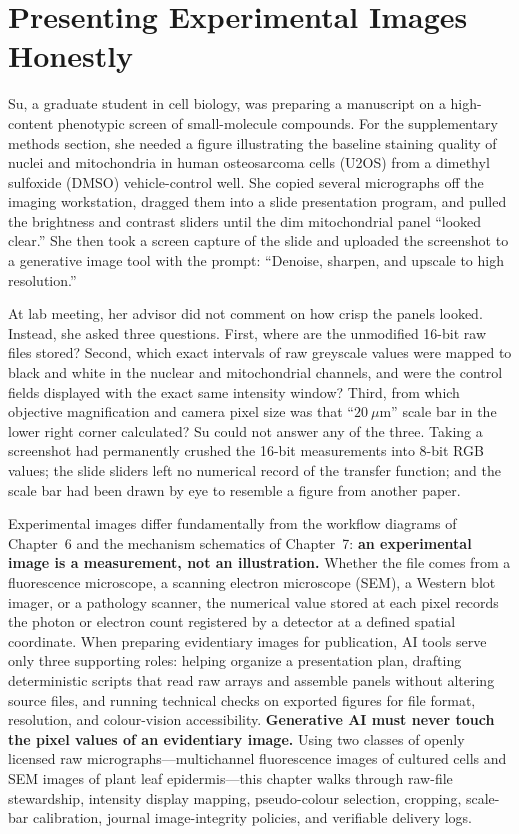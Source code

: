 \chapter{Presenting Experimental Images Honestly}

Su, a graduate student in cell biology, was preparing a manuscript on a high-content phenotypic screen of small-molecule compounds. For the supplementary methods section, she needed a figure illustrating the baseline staining quality of nuclei and mitochondria in human osteosarcoma cells (U2OS) from a dimethyl sulfoxide (DMSO) vehicle-control well. She copied several micrographs off the imaging workstation, dragged them into a slide presentation program, and pulled the brightness and contrast sliders until the dim mitochondrial panel ``looked clear.'' She then took a screen capture of the slide and uploaded the screenshot to a generative image tool with the prompt: ``Denoise, sharpen, and upscale to high resolution.''

At lab meeting, her advisor did not comment on how crisp the panels looked. Instead, she asked three questions. First, where are the unmodified 16-bit raw files stored? Second, which exact intervals of raw greyscale values were mapped to black and white in the nuclear and mitochondrial channels, and were the control fields displayed with the exact same intensity window? Third, from which objective magnification and camera pixel size was that ``$20\ \mu\text{m}$'' scale bar in the lower right corner calculated? Su could not answer any of the three. Taking a screenshot had permanently crushed the 16-bit measurements into 8-bit RGB values; the slide sliders left no numerical record of the transfer function; and the scale bar had been drawn by eye to resemble a figure from another paper.

Experimental images differ fundamentally from the workflow diagrams of Chapter~6 and the mechanism schematics of Chapter~7: \textbf{an experimental image is a measurement, not an illustration.} Whether the file comes from a fluorescence microscope, a scanning electron microscope (SEM), a Western blot imager, or a pathology scanner, the numerical value stored at each pixel records the photon or electron count registered by a detector at a defined spatial coordinate. When preparing evidentiary images for publication, AI tools serve only three supporting roles: helping organize a presentation plan, drafting deterministic scripts that read raw arrays and assemble panels without altering source files, and running technical checks on exported figures for file format, resolution, and colour-vision accessibility. \textbf{Generative AI must never touch the pixel values of an evidentiary image.} Using two classes of openly licensed raw micrographs---multichannel fluorescence images of cultured cells and SEM images of plant leaf epidermis---this chapter walks through raw-file stewardship, intensity display mapping, pseudo-colour selection, cropping, scale-bar calibration, journal image-integrity policies, and verifiable delivery logs.

